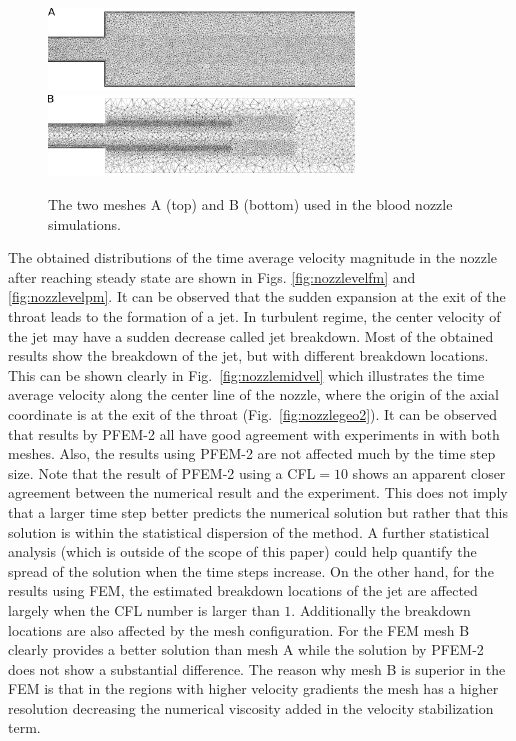 \begin{figure}[htbp]
    \centering
    \includegraphics[width=3.2in]{imgs/nozzle_pump/nozzle_fmesh_2.pdf}
    \includegraphics[width=3.2in]{imgs/nozzle_pump/nozzle_pmesh_2.pdf}
    \caption{The two meshes A (top) and B (bottom) used in the blood nozzle simulations.}
    \label{fig:nozzlemesh}
\end{figure}

The obtained distributions of the time average velocity magnitude in the nozzle after reaching steady state are shown in Figs. \ref{fig:nozzlevelfm} and \ref{fig:nozzlevelpm}. It can be observed that the sudden expansion at the exit of the throat leads to the formation of a jet. In turbulent regime, the center velocity of the jet may have a sudden decrease called jet breakdown. Most of the obtained results show the breakdown of the jet, but with different breakdown locations. This can be shown clearly in Fig.~\ref{fig:nozzlemidvel} which illustrates the time average velocity along the center line of the nozzle, where the origin of the axial coordinate is at the exit of the throat (Fig.~\ref{fig:nozzlegeo2}). It can be observed that results by PFEM-2 all have good agreement with experiments in \cite{hariharan_nozzle} with both meshes. Also, the results using PFEM-2 are not affected much by the time step size. Note that the result of PFEM-2 using a CFL$=10$ shows an apparent closer agreement between the numerical result and the experiment. This does not imply that a larger time step better predicts the numerical solution but rather that this solution is within the statistical dispersion of the method. A further statistical analysis (which is outside of the scope of this paper) could help quantify the spread of the solution when the time steps increase. On the other hand, for the results using FEM, the estimated breakdown locations of the jet are affected largely when the CFL number is larger than $1$. Additionally the breakdown locations are also affected by the mesh configuration. For the FEM mesh B clearly provides a better solution than mesh A while the solution by PFEM-2 does not show a substantial difference. The reason why mesh B is superior in the FEM is that in the regions with higher velocity gradients the mesh has a higher resolution decreasing the numerical viscosity added in the velocity stabilization term. 

